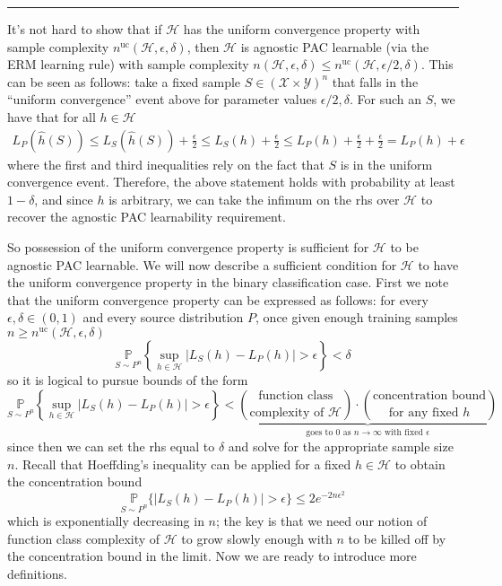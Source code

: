 \documentclass[]{article}
\begin{document}
\begin{center}\rule{0.5\linewidth}{\linethickness}\end{center}

It's not hard to show that if \(\mathcal{H}\) has the uniform
convergence property with sample complexity
\(n^{\text{uc}}(\mathcal{H}, \epsilon, \delta)\), then \(\mathcal{H}\)
is agnostic PAC learnable (via the ERM learning rule) with sample
complexity
\(n(\mathcal{H}, \epsilon, \delta) \le n^{\text{uc}}(\mathcal{H}, \epsilon/2, \delta)\).
This can be seen as follows: take a fixed sample
\(S\in (\mathcal{X}\times\mathcal{Y})^n\) that falls in the ``uniform
convergence'' event above for parameter values \(\epsilon/2, \delta\).
For such an \(S\), we have that for all \(h\in \mathcal{H}\) \[
\begin{align*}
L_P(\hat{h}(S)) \le L_S(\hat{h}(S)) + \frac{\epsilon}{2} \le L_S(h) + \frac{\epsilon}{2} \le L_P(h) + \frac{\epsilon}{2} + \frac{\epsilon}{2} = L_P(h) + \epsilon
\end{align*}
\] where the first and third inequalities rely on the fact that \(S\) is
in the uniform convergence event. Therefore, the above statement holds
with probability at least \(1 - \delta\), and since \(h\) is arbitrary,
we can take the infimum on the rhs over \(\mathcal{H}\) to recover the
agnostic PAC learnability requirement.

So possession of the uniform convergence property is sufficient for
\(\mathcal{H}\) to be agnostic PAC learnable. We will now describe a
sufficient condition for \(\mathcal{H}\) to have the uniform convergence
property in the binary classification case. First we note that the
uniform convergence property can be expressed as follows: for every
\(\epsilon, \delta \in (0,1)\) and every source distribution \(P\), once
given enough training samples
\(n\ge n^{\text{uc}}(\mathcal{H}, \epsilon, \delta)\) \[
\underset{S\sim P^n}{\mathbb{P}} \left\{ \sup_{h\in \mathcal{H}} |L_S(h) - L_P(h)| > \epsilon\right\} < \delta
\] so it is logical to pursue bounds of the form \[
\underset{S\sim P^n}{\mathbb{P}} \left\{ \sup_{h\in \mathcal{H}} |L_S(h) - L_P(h)| > \epsilon\right\} < \underbrace{ \binom{\text{function class}}{\text{complexity of } \mathcal{H}} \cdot \binom{\text{concentration bound}}{\text{for any fixed } h}}_{\text{goes to 0 as } n\rightarrow \infty \text{ with fixed }\epsilon} \tag{*}
\] since then we can set the rhs equal to \(\delta\) and solve for the
appropriate sample size \(n\). Recall that Hoeffding's inequality can be
applied for a fixed \(h\in \mathcal{H}\) to obtain the concentration
bound \[
\underset{S\sim P^n}{\mathbb{P}}\{|L_S(h) - L_P(h)| > \epsilon\} \le 2e^{-2n\epsilon^2}
\] which is exponentially decreasing in \(n\); the key is that we need
our notion of function class complexity of \(\mathcal{H}\) to grow
slowly enough with \(n\) to be killed off by the concentration bound in
the limit. Now we are ready to introduce more definitions.
\end{document}
